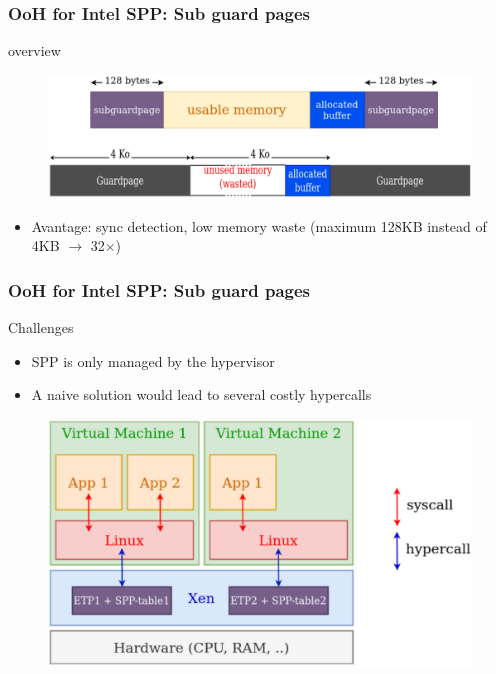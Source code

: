\documentclass[xcolor=table,bigger,unknownkeysallowed]{beamer}
\begin{document}
        \begin{frame}
        \frametitle{OoH for Intel SPP: Sub guard pages} 
			\begin{block}{overview}
 		    \begin{figure}
			\centering
				\includegraphics[width=1\columnwidth]{fig/spp-overflow}
			\end{figure}			
				\begin{itemize}
					\item Avantage: sync detection, low memory waste (maximum 128KB instead of 4KB $\rightarrow$ 32$\times$)
				\end{itemize}
			\end{block}		
        \end{frame}   
        \begin{frame}
        \frametitle{OoH for Intel SPP: Sub guard pages}
			\begin{block}{Challenges}			
				\begin{itemize}
					\item SPP is only managed by the hypervisor
					\item A naive solution would lead to several costly hypercalls
				\end{itemize}
			\end{block}	
 		    \begin{figure}
			\centering
				\includegraphics[width=.5\columnwidth]{fig/s0}
			\end{figure}				
        \end{frame}
\end{document}
